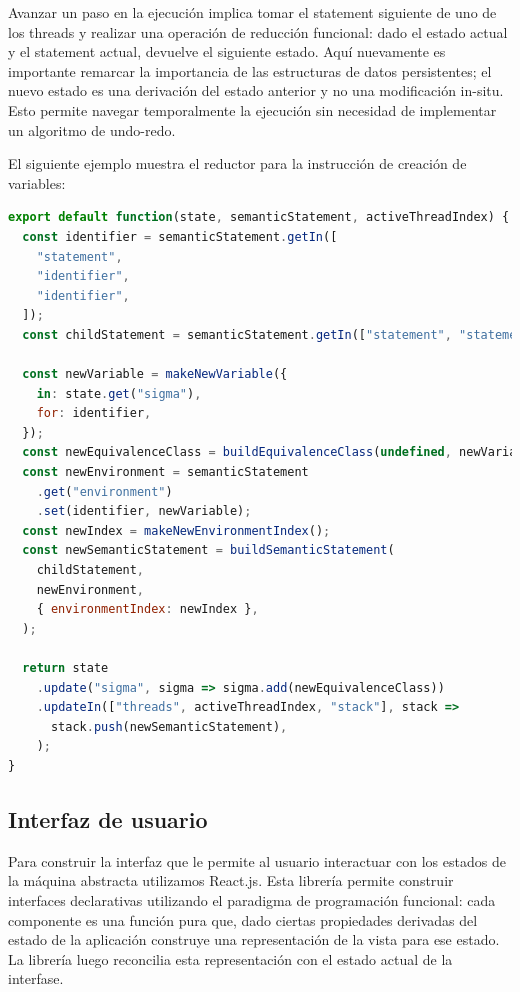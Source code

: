 \documentclass[a4paper,11pt]{article}
\begin{document}
Avanzar un paso en la ejecución implica tomar el statement siguiente de uno de los threads y realizar una operación de reducción funcional\cite{fold}: dado el estado actual y el statement actual, devuelve el siguiente estado. Aquí nuevamente es importante remarcar la importancia de las estructuras de datos persistentes; el nuevo estado es una derivación del estado anterior y no una modificación in-situ. Esto permite navegar temporalmente la ejecución sin necesidad de implementar un algoritmo de undo-redo.

El siguiente ejemplo muestra el reductor para la instrucción de creación de variables:

\begin{lstlisting}[language=javascript]
export default function(state, semanticStatement, activeThreadIndex) {
  const identifier = semanticStatement.getIn([
    "statement",
    "identifier",
    "identifier",
  ]);
  const childStatement = semanticStatement.getIn(["statement", "statement"]);

  const newVariable = makeNewVariable({
    in: state.get("sigma"),
    for: identifier,
  });
  const newEquivalenceClass = buildEquivalenceClass(undefined, newVariable);
  const newEnvironment = semanticStatement
    .get("environment")
    .set(identifier, newVariable);
  const newIndex = makeNewEnvironmentIndex();
  const newSemanticStatement = buildSemanticStatement(
    childStatement,
    newEnvironment,
    { environmentIndex: newIndex },
  );

  return state
    .update("sigma", sigma => sigma.add(newEquivalenceClass))
    .updateIn(["threads", activeThreadIndex, "stack"], stack =>
      stack.push(newSemanticStatement),
    );
}
\end{lstlisting}


\subsection{Interfaz de usuario}

Para construir la interfaz que le permite al usuario interactuar con los estados de la máquina abstracta utilizamos React.js\cite{react}. Esta librería permite construir interfaces declarativas utilizando el paradigma de programación funcional: cada componente es una función pura que, dado ciertas propiedades derivadas del estado de la aplicación construye una representación de la vista para ese estado. La librería luego reconcilia esta representación con el estado actual de la interfase.
\end{document}
